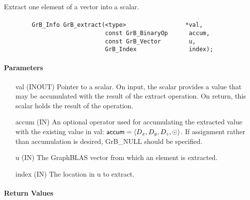 

Extract one element of a vector into a scalar. 

\paragraph{\syntax}

\begin{verbatim}
        GrB_Info GrB_extract(<type>                 *val,
                             const GrB_BinaryOp      accum,
                             const GrB_Vector        u,
                             GrB_Index               index); 
\end{verbatim}

\paragraph{Parameters}

\begin{itemize}[leftmargin=1in]
    \item[{\sf val}]   ({\sf INOUT}) Pointer to a scalar. On input, the scalar
    provides a value that may be accumulated with the result of the extract
    operation.  On return, this scalar holds the result of the operation.

    \item[{\sf accum}] ({\sf IN}) An optional operator used for accumulating
    the extracted value with the existing value in {\sf val}: 
    ${\sf accum} = \langle D_x, D_y, D_z,\odot \rangle$. If assignment rather 
    than accumulation is desired, {\sf GrB\_NULL} should be specified.

    \item[{\sf u}]     ({\sf IN}) The GraphBLAS vector from which an element
    is extracted.
    
    \item[{\sf index}] ({\sf IN}) The location in {\sf u} to extract.
\end{itemize}

\paragraph{Return Values}

